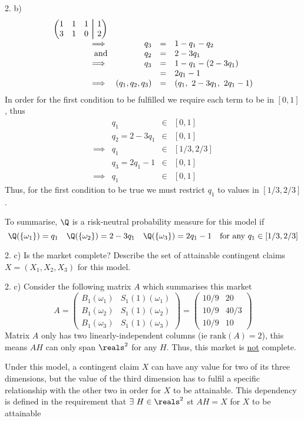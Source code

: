 \documentclass[11pt,a4paper]{article}
\newcommand\aug{\fboxsep=-\fboxrule\!\!\!\fbox{\strut}\!\!\!}
\begin{document}
\begin{answer}{2. b)}
\[\begin{array}{rrcl}
\begin{pmatrix}
      1&1&1&\aug&1\\
      3&1&0&\aug&2
    \end{pmatrix}\\
    \implies&q_3&=&1-q_1-q_2\\
    \text{and}&q_2&=&2-3q_1\\
    \implies&q_3&=&1-q_1-(2-3q_1)\\
    &&=&2q_1-1\\
    \implies&(q_1,q_2,q_3)&=&(q_1,\ 2-3q_1,\ 2q_1-1)
  \end{array}\]
  In order for the first condition to be fulfilled we require each term to be in $[0,1]$, thus
  \[\begin{array}{rrcl}
    &q_1&\in&[0,1]\\
    &q_2=2-3q_1&\in&[0,1]\\
    \implies&q_1&\in&[1/3,2/3]\\
    &q_3=2q_1-1&\in&[0,1]\\
    \implies&q_1&\in&[0,1]
  \end{array}\]
  Thus, for the first condition to be true we must restrict $q_1$ to values in $[1/3,2/3]$.
  \par To summarise, $\Q$ is a risk-neutral probability measure for this model if
  \[ \Q(\{\omega_1\})=q_1\quad\Q(\{\omega_2\})=2-3q_1\quad\Q(\{\omega_3\})=2q_1-1\quad\text{for any }q_1\in[1/3,2/3] \]
\end{answer}

\begin{question}{2. c)}
  Is the market complete? Describe the set of attainable contingent claims $X=(X_1,X_2,X_3)$ for this model.
\end{question}

\begin{answer}{2. c)}
  Consider the following matrix $A$ which summarises this market
  \[ A=\begin{pmatrix}
    B_1(\omega_1)&S_1(1)(\omega_1)\\
    B_1(\omega_2)&S_1(1)(\omega_2)\\
    B_1(\omega_3)&S_1(1)(\omega_3)
  \end{pmatrix}=\begin{pmatrix}
    10/9&20\\
    10/9&40/3\\
    10/9&10
  \end{pmatrix}
  \]
  Matrix $A$ only has two linearly-independent columns (ie $\text{rank}(A)=2$), this means $AH$ can only span $\reals^2$ for any $H$. Thus, this market is \underline{not} complete.
  \par Under this model, a contingent claim $X$ can have any value for two of its three dimensions, but the value of the third dimension has to fulfil a specific relationship with the other two in order for $X$ to be attainable. This dependency is defined in the requirement that $\exists\ H\in\reals^2$ st $AH=X$ for $X$ to be attainable
\end{answer}
\end{document}
